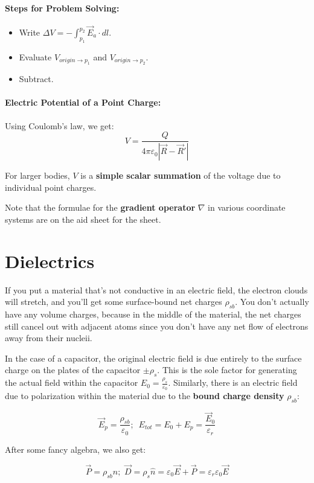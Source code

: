 \documentclass[a4paper,12pt]{report}
\begin{document}
\paragraph{Steps for Problem Solving: }
\begin{itemize}
\item Write $\Delta V = -\int_{p_1}^{p_2} \vec{E}_a \cdot dl$.
\item Evaluate $V_{origin \to p_1}$ and $V_{origin \to p_2}$.
\item Subtract.
\end{itemize}

\paragraph{Electric Potential of a Point Charge: } Using Coulomb's law, we get: $$V = \frac{Q}{4\pi \varepsilon_0 |\vec{R} - \vec{R}'|}$$

For larger bodies, $V$ is a \textbf{simple scalar summation} of the voltage due to individual point charges.

Note that the formulae for the \textbf{gradient operator} $\nabla$ in various coordinate systems are on the aid sheet for the sheet.


\section{Dielectrics}

If you put a material that's not conductive in an electric field, the electron clouds will stretch, and you'll get some surface-bound net charges $\rho_{sb}$. You don't actually have any volume charges, because in the middle of the material, the net charges still cancel out with adjacent atoms since you don't have any net flow of electrons away from their nucleii.

In the case of a capacitor, the original electric field is due entirely to the surface charge on the plates of the capacitor $\pm \rho_s$. This is the sole factor for generating the actual field within the capacitor $E_0 = \frac{\rho_{s}}{\varepsilon_0}$. Similarly, there is an electric field due to polarization within the material due to the \textbf{bound charge density} $\rho_{sb}$: 

$$\vec E_p = \frac{\rho_{sb}}{\varepsilon_0};\,\,\, E_{tot} = E_0 + E_p = \frac{\vec E_0}{\varepsilon_r}$$

After some fancy algebra, we also get: 

$$\vec P = \rho_{sb} \hat n; \,\, \vec D = \rho_s \hat n = \varepsilon_0 \vec E + \vec P = \varepsilon_r \varepsilon_0 \vec E$$
\end{document}
